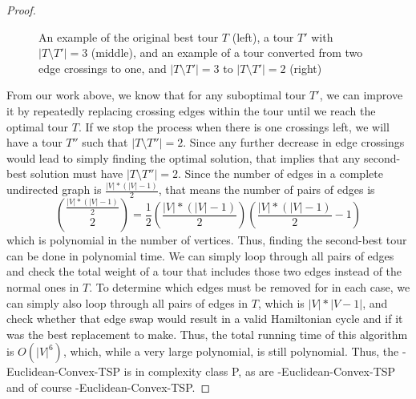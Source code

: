 \begin{proof}
\begin{figure}[!ht]
	\caption{An example of the original best tour $T$ (left), a tour $T'$ with $|T \setminus T'| = 3$ (middle), and an example of a tour converted from two edge crossings to one, and $|T \setminus T'| = 3$ to $|T \setminus T'| = 2$ (right)} \label{3diff}
\end{figure}

From our work above, we know that for any suboptimal tour $T'$, we can improve it by repeatedly replacing crossing edges within the tour until we reach the optimal tour $T$. If we stop the process when there is one crossings left, we will have a tour $T''$ such that $|T \setminus T''| = 2$. Since any further decrease in edge crossings would lead to simply finding the optimal solution, that implies that any second-best solution must have $|T \setminus T''| = 2$. Since the number of edges in a complete undirected graph is $\frac{|V|*(|V|-1)}{2}$, that means the number of pairs of edges is 
\begin{equation*}
    \binom{\frac{|V|*(|V|-1)}{2}}{2} = \frac{1}{2}(\frac{|V|*(|V|-1)}{2})(\frac{|V|*(|V|-1)}{2} - 1)
\end{equation*}
which is polynomial in the number of vertices. Thus, finding the second-best tour can be done in polynomial time. We can simply loop through all pairs of edges and check the total weight of a tour that includes those two edges instead of the normal ones in $T$. To determine which edges must be removed for in each case, we can simply also loop through all pairs of edges in $T$, which is $|V|*|V-1|$, and check whether that edge swap would result in a valid Hamiltonian cycle and if it was the best replacement to make. Thus, the total running time of this algorithm is $O(|V|^6)$, which, while a very large polynomial, is still polynomial. Thus, the \exob-Euclidean-Convex-TSP is in complexity class P, as are \inob{}-Euclidean-Convex-TSP and of course \exb{}-Euclidean-Convex-TSP.\end{proof}
